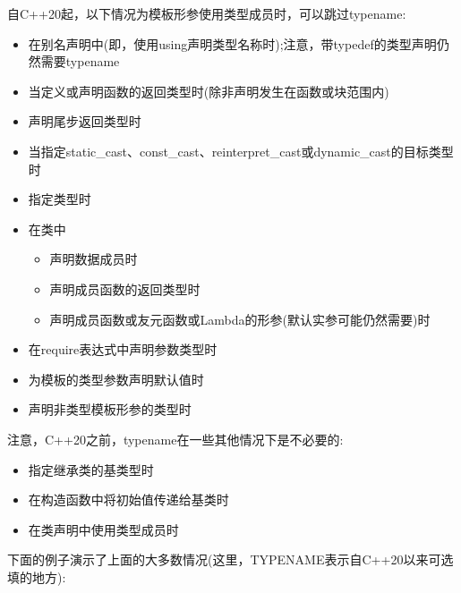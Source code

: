 自C++20起，以下情况为模板形参使用类型成员时，可以跳过typename:

\begin{itemize}
\item 
在别名声明中(即，使用using声明类型名称时);注意，带typedef的类型声明仍然需要typename

\item 
当定义或声明函数的返回类型时(除非声明发生在函数或块范围内)

\item 
声明尾步返回类型时

\item 
当指定static\_cast、const\_cast、reinterpret\_cast或dynamic\_cast的目标类型时

\item 
指定类型时

\item 
在类中

\begin{itemize}
\item 
声明数据成员时

\item 
声明成员函数的返回类型时

\item 
声明成员函数或友元函数或Lambda的形参(默认实参可能仍然需要)时
\end{itemize}

\item 
在require表达式中声明参数类型时

\item 
为模板的类型参数声明默认值时

\item 
声明非类型模板形参的类型时
\end{itemize}

注意，C++20之前，typename在一些其他情况下是不必要的:

\begin{itemize}
\item 
指定继承类的基类型时

\item 
在构造函数中将初始值传递给基类时

\item 
在类声明中使用类型成员时
\end{itemize}

下面的例子演示了上面的大多数情况(这里，TYPENAME表示自C++20以来可选填的地方):

